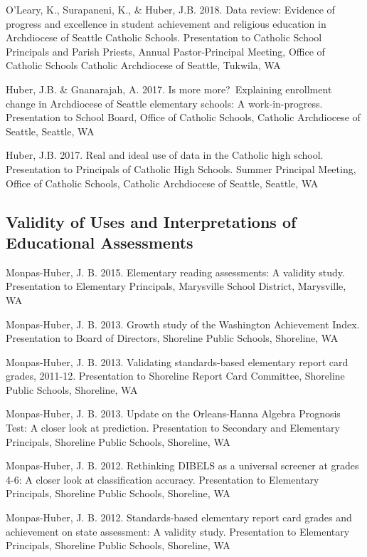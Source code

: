 \documentclass[
  letterpaper,
]{article}
\begin{document}
O'Leary, K., Surapaneni, K., \& Huber, J.B. 2018. Data review: Evidence
of progress and excellence in student achievement and religious
education in Archdiocese of Seattle Catholic Schools. Presentation to
Catholic School Principals and Parish Priests, Annual Pastor-Principal
Meeting, Office of Catholic Schools Catholic Archdiocese of Seattle,
Tukwila, WA

Huber, J.B. \& Gnanarajah, A. 2017. Is more more?~Explaining enrollment
change in Archdiocese of Seattle elementary schools: A work-in-progress.
Presentation to School Board, Office of Catholic Schools, Catholic
Archdiocese of Seattle, Seattle, WA

Huber, J.B. 2017. Real and ideal use of data in the Catholic high
school. Presentation to Principals of Catholic High Schools. Summer
Principal Meeting, Office of Catholic Schools, Catholic Archdiocese of
Seattle, Seattle, WA

\subsection{Validity of Uses and Interpretations of Educational
Assessments}\label{validity-of-uses-and-interpretations-of-educational-assessments}

Monpas-Huber, J. B. 2015. Elementary reading assessments: A validity
study. Presentation to Elementary Principals, Marysville School
District, Marysville, WA

Monpas-Huber, J. B. 2013. Growth study of the Washington Achievement
Index. Presentation to Board of Directors, Shoreline Public Schools,
Shoreline, WA

Monpas-Huber, J. B. 2013. Validating standards-based elementary report
card grades, 2011-12. Presentation to Shoreline Report Card Committee,
Shoreline Public Schools, Shoreline, WA

Monpas-Huber, J. B. 2013. Update on the Orleans-Hanna Algebra Prognosis
Test: A closer look at prediction. Presentation to Secondary and
Elementary Principals, Shoreline Public Schools, Shoreline, WA

Monpas-Huber, J. B. 2012. Rethinking DIBELS as a universal screener at
grades 4-6: A closer look at classification accuracy. Presentation to
Elementary Principals, Shoreline Public Schools, Shoreline, WA

Monpas-Huber, J. B. 2012. Standards-based elementary report card grades
and achievement on state assessment: A validity study. Presentation to
Elementary Principals, Shoreline Public Schools, Shoreline, WA
\end{document}
